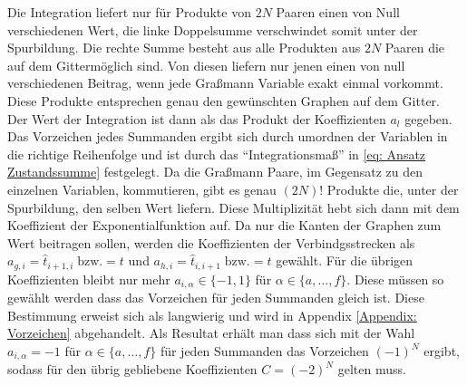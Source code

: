 \noindent Die Integration liefert nur für Produkte von $2N$ Paaren einen von Null verschiedenen Wert, die linke Doppelsumme verschwindet somit unter der Spurbildung. Die rechte Summe besteht aus alle Produkten aus $2N$ Paaren die auf dem Gittermöglich sind. Von diesen liefern nur jenen einen von null verschiedenen Beitrag, wenn jede Graßmann Variable exakt einmal vorkommt. Diese Produkte entsprechen genau den gewünschten Graphen auf dem Gitter. Der Wert der Integration ist dann als das Produkt der Koeffizienten $a_l$ gegeben. Das Vorzeichen jedes Summanden ergibt sich durch umordnen der Variablen in die richtige Reihenfolge und ist durch das ``Integrationsmaß'' in \eqref{eq: Ansatz Zustandssumme} festgelegt. Da die Graßmann Paare, im Gegensatz zu den einzelnen Variablen, kommutieren, gibt es genau $(2N)!$ Produkte die, unter der Spurbildung, den selben Wert liefern. Diese Multiplizität hebt sich dann mit dem Koeffizient der Exponentialfunktion auf. Da nur die Kanten der Graphen zum Wert beitragen sollen, werden die Koeffizienten der Verbindgsstrecken als $a_{g,i} = \hat{t}_{i+1, i} \;\text{bzw.} =  t$ und $a_{h,i} = \hat{t}_{i, i+1} \;\text{bzw.} = t$  gewählt. Für die übrigen Koeffizienten bleibt nur mehr $a_{i,\alpha} \in \{-1,1\}$ für $\alpha \in \{a,\dots,f\}$. Diese müssen so gewählt werden dass das Vorzeichen für jeden Summanden gleich ist. Diese Bestimmung erweist sich als langwierig und wird in Appendix \ref{Appendix: Vorzeichen} abgehandelt. Als Resultat erhält man dass sich mit der Wahl $a_{i,\alpha} = -1 $ für $\alpha \in \{a,\dots,f\}$ für jeden Summanden das Vorzeichen $(-1)^N$ ergibt, sodass für den übrig gebliebene Koeffizienten $C = (-2)^N$ gelten muss. 

